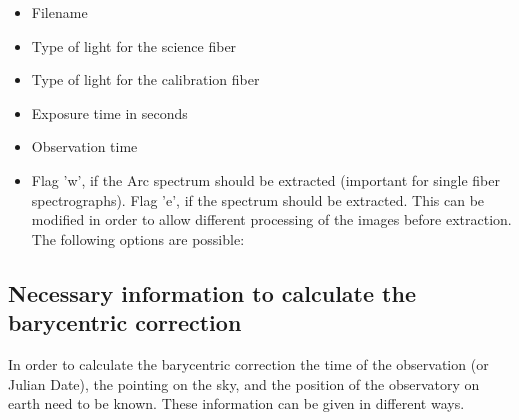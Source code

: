 \documentclass[10pt,a4paper]{article}
\begin{document}
\begin{itemize}\setlength\itemsep{0em}
  \item Filename
  \item Type of light for the science fiber
  \item Type of light for the calibration fiber
  \item Exposure time in seconds
  \item Observation time
  \item Flag 'w', if the Arc spectrum should be extracted (important for single fiber spectrographs). Flag 'e', if the spectrum should be extracted. This can be modified in order to allow different processing of the images before extraction. The following options are possible:
\end{itemize}

\subsection{Necessary information to calculate the barycentric correction}
\label{Section:barycentric_correction}
In order to calculate the barycentric correction the time of the observation (or Julian Date), the pointing on the sky, and the position of the observatory on earth need to be known. These information can be given in different ways. 
\end{document}
